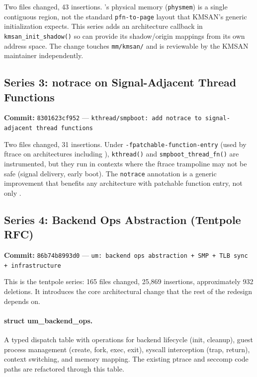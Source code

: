 Two files changed, 43 insertions.  \UML{}'s physical memory
(\texttt{physmem}) is a single contiguous  region, not
the standard \texttt{pfn-to-page} layout that KMSAN's generic
initialization expects.  This series adds an architecture callback in
\texttt{kmsan\_init\_shadow()} so \UML{} can provide its
shadow/origin mappings from its own address space.  The change touches
\texttt{mm/kmsan/} and is reviewable by the KMSAN maintainer
independently.


\subsection{Series 3: notrace on Signal-Adjacent Thread Functions}
\label{sec:v2-series3}

\textbf{Commit:} \texttt{8301623cf952} ---
\texttt{kthread/smpboot: add notrace to signal-adjacent thread functions}

Two files changed, 31 insertions.  Under
\texttt{-fpatchable-function-entry} (used by ftrace on architectures
including \UML{}), \texttt{kthread()} and \texttt{smpboot\_thread\_fn()}
are instrumented, but they run in contexts where the ftrace trampoline
may not be safe (signal delivery, early boot).  The \texttt{notrace}
annotation is a generic improvement that benefits any architecture
with patchable function entry, not only \UML{}.


\subsection{Series 4: Backend Ops Abstraction (Tentpole RFC)}
\label{sec:v2-series4}

\textbf{Commit:} \texttt{86b74b8993d0} ---
\texttt{um: backend ops abstraction + SMP + TLB sync + infrastructure}

This is the tentpole series: 165 files changed, 25,869 insertions,
approximately 932 deletions.  It introduces the core architectural
change that the rest of the redesign depends on.

\paragraph{struct um\_backend\_ops.}
A typed dispatch table with operations for backend lifecycle (init,
cleanup), guest process management (create, fork, exec, exit),
syscall interception (trap, return), context switching, and memory
mapping.  The existing ptrace and seccomp code paths are refactored
through this table.


